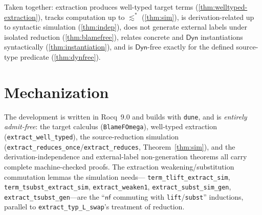 \documentclass[acmsmall,anonymous=false,nonacm]{acmart}
\newcommand{\dyn}{\ensuremath{\mathsf{Dyn}}}
\newcommand{\nf}{\mathsf{nf}}
\newcommand{\sepsim}{\mathrel{\lesssim}}
\begin{document}
\medskip
Taken together: extraction produces well-typed target terms
(\ref{thm:welltyped-extraction}), tracks computation up to $\sepsim^{*}$
(\ref{thm:sim}), is derivation-related up to syntactic simulation
(\ref{thm:indep}), does not generate external labels under isolated reduction
(\ref{thm:blamefree}), relates concrete and $\dyn$ instantiations syntactically
(\ref{thm:instantiation}), and is $\dyn$-free exactly for the defined source-type predicate
(\ref{thm:dynfree}).

\section{Mechanization}\label{sec:mech}

The development is written in Rocq~9.0 and builds with \texttt{dune}, and is
\emph{entirely admit-free}: the target calculus (\texttt{BlameFOmega}),
well-typed extraction (\texttt{extract\_well\_typed}), the source-reduction
simulation (\texttt{extract\_reduces\_once}/\texttt{extract\_reduces},
Theorem~\ref{thm:sim}), and the derivation-independence and external-label
non-generation theorems all carry complete machine-checked proofs. The extraction
weakening/substitution commutation lemmas the simulation needs---%
\texttt{term\_tlift\_extract\_sim}, \texttt{term\_tsubst\_extract\_sim},
\texttt{extract\_weaken1}, \texttt{extract\_subst\_sim\_gen},
\texttt{extract\_tsubst\_gen}---are the ``$\nf$ commuting with
\texttt{lift}/\texttt{subst}'' inductions, parallel to
\texttt{extract\_typ\_L\_swap}'s treatment of reduction.
\end{document}
